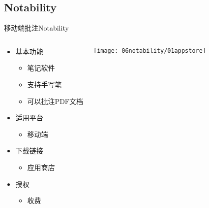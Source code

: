 \documentclass[fontset = none, t, aspectratio=169]{ctexbeamer}
\begin{document}
\subsection{Notability}
\begin{frame}{移动端批注}{Notability}
  \begin{columns}[c,onlytextwidth]
    \begin{spacing}{1.3}
    \begin{itemize}
    \item 基本功能
      \begin{itemize}
      \item 笔记软件
      \item 支持手写笔
      \item 可以\alert{批注}PDF文档
      \end{itemize}
    \item 适用平台
      \begin{itemize}
      \item 移动端
      \end{itemize}
    \item 下载链接
      \begin{itemize}
      \item 应用商店
      \end{itemize}
    \item 授权
      \begin{itemize}
      \item \alert{收费}
      \end{itemize}
    \end{itemize}
    \end{spacing}
    \centering
    \texttt{[image: 06notability/01appstore]}
  \end{columns}
\end{frame}
\end{document}
